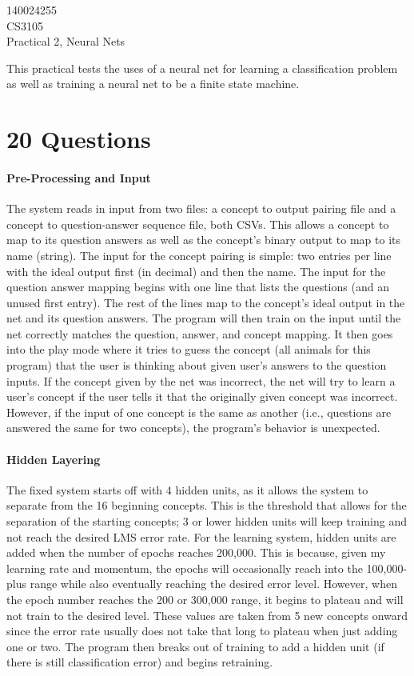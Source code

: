 \documentclass[12pt]{article}
\begin{document}
\begin{flushright}
140024255\\
CS3105\\
Practical 2, Neural Nets
\end{flushright}

This practical tests the uses of a neural net for learning a classification problem as well as training a neural net to be a finite state machine.

\section{20 Questions}
\paragraph*{Pre-Processing and Input}
The system reads in input from two files: a concept to output pairing file and a concept to question-answer sequence file, both CSVs. This allows a concept to map to its question answers as well as the concept's binary output to map to its name (string). The input for the concept pairing is simple: two entries per line with the ideal output first (in decimal) and then the name. The input for the question answer mapping begins with one line that lists the questions (and an unused first entry). The rest of the lines map to the concept's ideal output in the net and its question answers. 
The program will then train on the input until the net correctly matches the question, answer, and concept mapping. It then goes into the play mode where it tries to guess the concept (all animals for this program) that the user is thinking about given user's answers to the question inputs. If the concept given by the net was incorrect, the net will try to learn a user's concept if the user tells it that the originally given concept was incorrect. However, if the input of one concept is the same as another (i.e., questions are answered the same for two concepts), the program's behavior is unexpected.

\paragraph*{Hidden Layering}
The fixed system starts off with 4 hidden units, as it allows the system to separate from the 16 beginning concepts. This is the threshold that allows for the separation of the starting concepts; 3 or lower hidden units will keep training and not reach the desired LMS error rate. For the learning system, hidden units are added when the number of epochs reaches 200,000. This is because, given my learning rate and momentum, the epochs will occasionally reach into the 100,000-plus range while also eventually reaching the desired error level. However, when the epoch number reaches the 200 or 300,000 range, it begins to plateau and will not train to the desired level. These values are taken from 5 new concepts onward since the error rate usually does not take that long to plateau when just adding one or two. The program then breaks out of training to add a hidden unit (if there is still classification error) and begins retraining.
\end{document}
